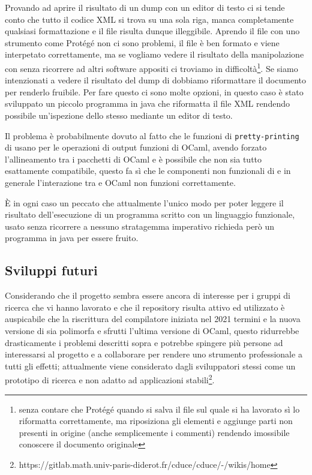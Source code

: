 Provando ad aprire il risultato di un dump con un editor di testo ci si tende conto che tutto il codice XML si trova su una sola riga, manca completamente qualsiasi formattazione e il file risulta dunque illeggibile. Aprendo il file con uno strumento come Protégé non ci sono problemi, il file è ben formato e viene interpetato correttamente, ma se vogliamo vedere il risultato della manipolazione con \cduce senza ricorrere ad altri software appositi ci troviamo in difficoltà\footnote{senza contare che Protégé quando si salva il file sul quale si ha lavorato sì lo riformatta correttamente, ma riposiziona gli elementi e aggiunge parti non presenti in origine (anche semplicemente i commenti) rendendo imossibile conoscere il documento originale}. Se siamo intenzionati a vedere il risultato del dump di \cduce dobbiamo riformattare il documento per renderlo fruibile. Per fare questo ci sono molte opzioni, in questo caso è stato sviluppato un piccolo programma in java che riformatta il file XML rendendo possibile un'ispezione dello stesso mediante un editor di testo. 

Il problema è probabilmente dovuto al fatto che le funzioni di \verb|pretty-printing| di \cduce usano per le operazioni di output funzioni di OCaml, avendo forzato l'allineamento tra i pacchetti di OCaml e \cduce è possibile che non sia tutto esattamente compatibile, questo fa sì che le componenti non funzionali di \cduce e in generale l'interazione tra \cduce e OCaml non funzioni correttamente.

È in ogni caso un peccato che attualmente l'unico modo per poter leggere il risultato dell'esecuzione di un programma scritto con un linguaggio funzionale, usato senza ricorrere a nessuno stratagemma imperativo richieda però un programma in java per essere fruito.
\subsection{Sviluppi futuri}
Considerando che il progetto sembra essere ancora di interesse per i gruppi di ricerca che vi hanno lavorato e che il repository risulta attivo ed utilizzato è auspicabile che la riscrittura del compilatore iniziata nel 2021 termini e la nuova versione di \cduce sia polimorfa e sfrutti l'ultima versione di OCaml, questo ridurrebbe drasticamente i problemi descritti sopra e potrebbe spingere più persone ad interessarsi al progetto e a collaborare per rendere \cduce uno strumento professionale a tutti gli effetti; attualmente \cduce viene considerato dagli sviluppatori stessi come un prototipo di ricerca e non adatto ad applicazioni stabili\footnote{https://gitlab.math.univ-paris-diderot.fr/cduce/cduce/-/wikis/home}.

